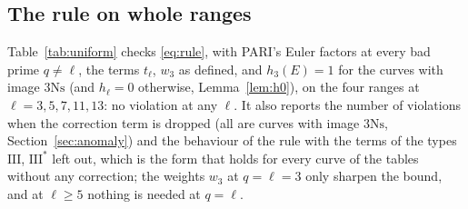 \documentclass[11pt]{amsart}
\theoremstyle{definition}
\newcommand{\Ns}{3\mathrm{Ns}}
\begin{document}
\subsection{The rule on whole ranges}
Table~\ref{tab:uniform} checks \eqref{eq:rule}, with PARI's Euler factors at every bad prime $q\ne\ell$, the terms $t_\ell$, $w_3$ as defined, and $h_3(E)=1$ for the curves with image $\Ns$ (and $h_\ell=0$ otherwise, Lemma~\ref{lem:h0}), on the four ranges at $\ell=3,5,7,11,13$: no violation at any $\ell$. It also reports the number of violations when the correction term is dropped (all are curves with image $\Ns$, Section~\ref{sec:anomaly}) and the behaviour of the rule with the terms of the types $\mathrm{III}$, $\mathrm{III}^*$ left out, which is the form that holds for every curve of the tables without any correction; the weights $w_3$ at $q=\ell=3$ only sharpen the bound, and at $\ell\ge5$ nothing is needed at $q=\ell$.

\begin{table}[ht]\centering\footnotesize

\caption{Conjecture~\ref{conj:euler} with PARI's factors at all primes: curves with $E[\ell]$ irreducible, not CM, with a positive bound in \eqref{eq:rule}; violations; equality rate among them; violations when the correction term $h_\ell$ is dropped; and the rule without the type $\mathrm{III}$ terms (``III-free'': positive bounds, violations, equality rate).}\label{tab:uniform}
\end{table}
\end{document}
